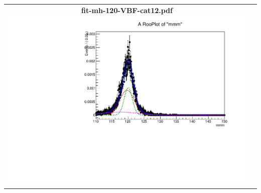 \begin{longtable}{|c|c|}
{}
 \\
\hline
\parbox{0.49\textwidth}{
\centering
{\bfseries fit-mh-120-VBF-cat12.pdf}
\includegraphics[width=.49\textwidth]{figures/signal_model/AppendixBdt/VBF/120/fit_mh_120_VBF_cat12.pdf}
}
 & \\ \hline
\end{longtable}
